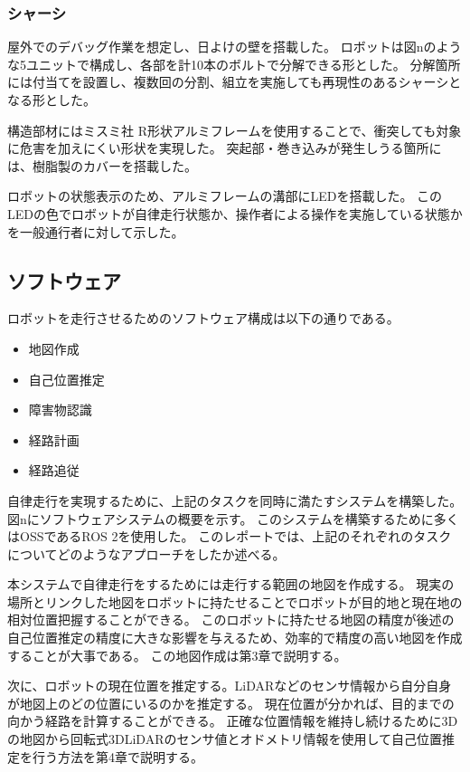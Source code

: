 \subsubsection{シャーシ}
屋外でのデバッグ作業を想定し、日よけの壁を搭載した。
ロボットは図nのような5ユニットで構成し、各部を計10本のボルトで分解できる形とした。
分解箇所には付当てを設置し、複数回の分割、組立を実施しても再現性のあるシャーシとなる形とした。

構造部材にはミスミ社 R形状アルミフレーム\cite{MISUMI}を使用することで、衝突しても対象に危害を加えにくい形状を実現した。
突起部・巻き込みが発生しうる箇所には、樹脂製のカバーを搭載した。

ロボットの状態表示のため、アルミフレームの溝部にLEDを搭載した。
このLEDの色でロボットが自律走行状態か、操作者による操作を実施している状態かを一般通行者に対して示した。

\subsection{ソフトウェア}
ロボットを走行させるためのソフトウェア構成は以下の通りである。
\begin{itemize}
    \item 地図作成
    \item 自己位置推定
    \item 障害物認識
    \item 経路計画
    \item 経路追従
\end{itemize}

自律走行を実現するために、上記のタスクを同時に満たすシステムを構築した。
図nにソフトウェアシステムの概要を示す。
このシステムを構築するために多くはOSSであるROS 2\cite{ROS2}を使用した。
このレポートでは、上記のそれぞれのタスクについてどのようなアプローチをしたか述べる。

本システムで自律走行をするためには走行する範囲の地図を作成する。
現実の場所とリンクした地図をロボットに持たせることでロボットが目的地と現在地の相対位置把握することができる。
このロボットに持たせる地図の精度が後述の自己位置推定の精度に大きな影響を与えるため、効率的で精度の高い地図を作成することが大事である。
この地図作成は第3章で説明する。

次に、ロボットの現在位置を推定する。LiDARなどのセンサ情報から自分自身が地図上のどの位置にいるのかを推定する。
現在位置が分かれば、目的までの向かう経路を計算することができる。
正確な位置情報を維持し続けるために3Dの地図から回転式3DLiDARのセンサ値とオドメトリ情報を使用して自己位置推定を行う方法を第4章で説明する。

